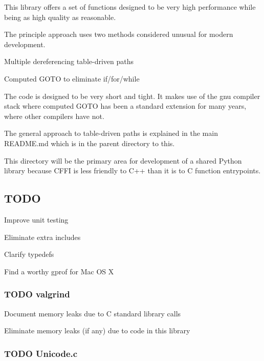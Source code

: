This library offers a set of functions designed to be very high performance while being as high quality as reasonable.

The principle approach uses two methods considered unusual for modern development.
\begin{DoxyItemize}
\item Multiple dereferencing table-\/driven paths
\item Computed G\+O\+T\+O to eliminate if/for/while
\end{DoxyItemize}

The code is designed to be very short and tight. It makes use of the gnu compiler stack where computed G\+O\+T\+O has been a standard extension for many years, where other compilers have not.

The general approach to table-\/driven paths is explained in the main R\+E\+A\+D\+M\+E.\+md which is in the parent directory to this.

This directory will be the primary area for development of a shared Python library because C\+F\+F\+I is less friendly to C++ than it is to C function entrypoints.

\subsection*{T\+O\+D\+O}


\begin{DoxyItemize}
\item Improve unit testing
\item Eliminate extra includes
\item Clarify typedefs
\item Find a worthy gprof for Mac O\+S X
\end{DoxyItemize}

\subsubsection*{T\+O\+D\+O valgrind}


\begin{DoxyItemize}
\item Document memory leaks due to C standard library calls
\item Eliminate memory leaks (if any) due to code in this library
\end{DoxyItemize}

\subsubsection*{T\+O\+D\+O Unicode.\+c}


